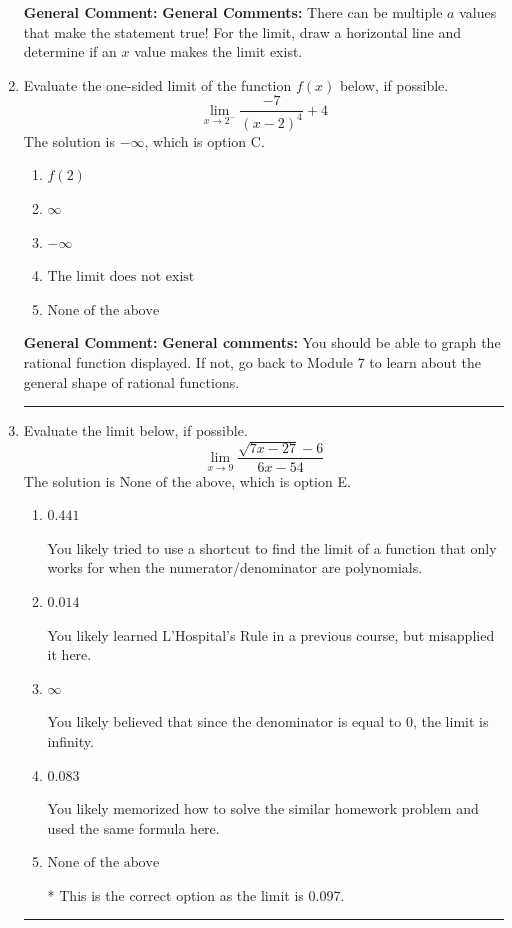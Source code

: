 \documentclass{extbook}[14pt]
\newcommand{\litem}[1]{\item #1

\rule{\textwidth}{0.4pt}}
\begin{document}
\begin{enumerate}
{\begin{enumerate}[label=\Alph*.]
\end{enumerate}

\textbf{General Comment:} \textbf{General Comments:} There can be multiple $a$ values that make the statement true! For the limit, draw a horizontal line and determine if an $x$ value makes the limit exist.
}
\litem{
Evaluate the one-sided limit of the function $f(x)$ below, if possible.
\[ \lim_{x \rightarrow 2^-} \frac{-7}{(x-2)^4}+4 \]The solution is \( -\infty \), which is option C.\begin{enumerate}[label=\Alph*.]
\item \( f(2) \)


\item \( \infty \)


\item \( -\infty \)


\item \( \text{The limit does not exist} \)


\item \( \text{None of the above} \)


\end{enumerate}

\textbf{General Comment:} \textbf{General comments:} You should be able to graph the rational function displayed. If not, go back to Module 7 to learn about the general shape of rational functions.
}
\litem{
Evaluate the limit below, if possible.
\[ \lim_{x \rightarrow 9} \frac{\sqrt{7x - 27} - 6}{6x - 54} \]The solution is \( \text{None of the above} \), which is option E.\begin{enumerate}[label=\Alph*.]
\item \( 0.441 \)

You likely tried to use a shortcut to find the limit of a function that only works for when the numerator/denominator are polynomials.
\item \( 0.014 \)

You likely learned L'Hospital's Rule in a previous course, but misapplied it here.
\item \( \infty \)

You likely believed that since the denominator is equal to 0, the limit is infinity.
\item \( 0.083 \)

You likely memorized how to solve the similar homework problem and used the same formula here.
\item \( \text{None of the above} \)

* This is the correct option as the limit is 0.097.
\end{enumerate}

}
\end{enumerate}
\end{document}
